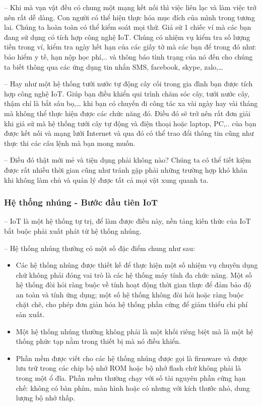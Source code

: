 	-- Khi mà vạn vật đều có chung một mạng kết nối thì việc liên lạc và làm việc trở nên rất dễ dàng. Con người có thể hiện thực hóa mục đích của mình trong tương lai. Chúng ta hoàn toàn có thể kiểm soát mọi thứ. Giả sử 1 chiếc ví mà các bạn đang sử dụng có tích hợp công nghệ IoT. Chúng có nhiệm vụ kiểm tra số lượng tiền trong ví, kiểm tra ngày hết hạn của các giấy tờ mà các bạn để trong đó như: bảo hiểm y tế, hạn nộp học phí,.. và thông báo tình trạng của nó đến cho chúng ta biết thông qua các ứng dụng tin nhắn SMS, facebook, skype, zalo,…
	
	-- Hay như một hệ thống tưới nước tự động cây cối trong gia đình bạn được tích hợp công nghệ IoT. Giúp bạn điều khiển qui trình chăm sóc cây, tưới nước cây, thậm chí là bắt sâu bọ,… khi bạn có chuyến đi công tác xa vài ngày hay vài tháng mà không thể thực hiện được các chức năng đó. Điều đó sẽ trở nên rất đơn giải khi giả sử mà hệ thống tưới cây tự động và điện thoại hoặc laptop, PC,.. của bạn được kết nối và mạng lưới Internet và qua đó có thể trao đổi thông tin cũng như thực thi các câu lệnh mà bạn mong muốn.
	
	-- Điều đó thật mới mẻ và tiện dụng phải không nào? Chúng ta có thể tiết kiệm được rất nhiều thời gian cũng như tránh gặp phải những trường hợp khó khăn khi không làm chủ và quản lý được tất cả mọi vật xung quanh ta.
	\subsubsection{Hệ thống nhúng - Bước đầu tiên IoT}
	-- IoT là một hệ thống tự trị, để làm được điều này, nền tảng kiến thức của IoT bắt buộc phải xuất phát từ hệ thống nhúng. 
	
	-- Hệ thống nhúng thường có một số đặc điểm chung như sau:
\begin{itemize}[leftmargin=2.2cm]
		\item Các hệ thống nhúng được thiết kế để thực hiện một số nhiệm vụ chuyên dụng chứ không phải đóng vai trò là các hệ thống máy tính đa chức năng. Một số hệ thống đòi hỏi ràng buộc về tính hoạt động thời gian thực để đảm bảo độ an toàn và tính ứng dụng; một số hệ thống không đòi hỏi hoặc ràng buộc chặt chẽ, cho phép đơn giản hóa hệ thống phần cứng để giảm thiểu chi phí sản xuất.
		
		\item Một hệ thống nhúng thường không phải là một khối riêng biệt mà là một hệ thống phức tạp nằm trong thiết bị mà nó điều khiển.
		
		\item Phần mềm được viết cho các hệ thống nhúng được gọi là firmware và được lưu trữ trong các chip bộ nhớ ROM hoặc bộ nhớ flash chứ không phải là trong một ổ đĩa. Phần mềm thường chạy với số tài nguyên phần cứng hạn chế: không có bàn phím, màn hình hoặc có nhưng với kích thước nhỏ, dung lượng bộ nhớ thấp.
\end{itemize}

